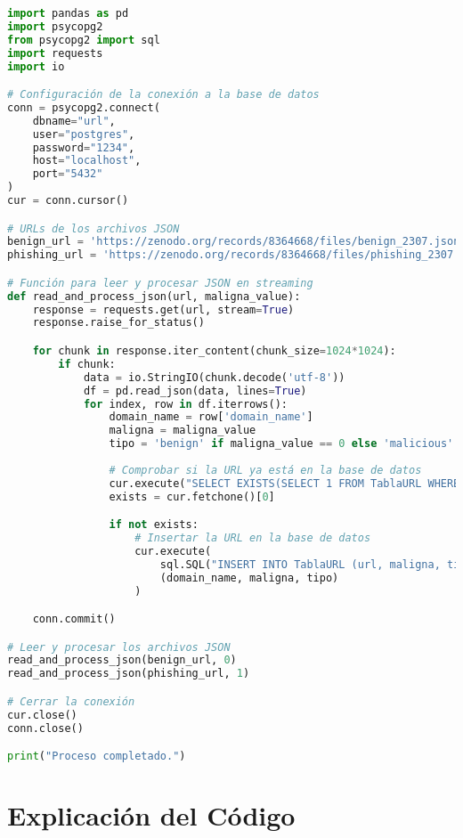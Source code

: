 \begin{lstlisting}[language=Python, caption=Script para procesar archivos JSON grandes y poblar la base de datos]
import pandas as pd
import psycopg2
from psycopg2 import sql
import requests
import io

# Configuración de la conexión a la base de datos
conn = psycopg2.connect(
    dbname="url",
    user="postgres",
    password="1234",
    host="localhost",
    port="5432"
)
cur = conn.cursor()

# URLs de los archivos JSON
benign_url = 'https://zenodo.org/records/8364668/files/benign_2307.json'
phishing_url = 'https://zenodo.org/records/8364668/files/phishing_2307.json'

# Función para leer y procesar JSON en streaming
def read_and_process_json(url, maligna_value):
    response = requests.get(url, stream=True)
    response.raise_for_status()

    for chunk in response.iter_content(chunk_size=1024*1024):
        if chunk:
            data = io.StringIO(chunk.decode('utf-8'))
            df = pd.read_json(data, lines=True)
            for index, row in df.iterrows():
                domain_name = row['domain_name']
                maligna = maligna_value
                tipo = 'benign' if maligna_value == 0 else 'malicious'
                
                # Comprobar si la URL ya está en la base de datos
                cur.execute("SELECT EXISTS(SELECT 1 FROM TablaURL WHERE url=%s)", (domain_name,))
                exists = cur.fetchone()[0]

                if not exists:
                    # Insertar la URL en la base de datos
                    cur.execute(
                        sql.SQL("INSERT INTO TablaURL (url, maligna, tipo) VALUES (%s, %s, %s)"),
                        (domain_name, maligna, tipo)
                    )

    conn.commit()

# Leer y procesar los archivos JSON
read_and_process_json(benign_url, 0)
read_and_process_json(phishing_url, 1)

# Cerrar la conexión
cur.close()
conn.close()

print("Proceso completado.")
\end{lstlisting}

\section*{Explicación del Código}

